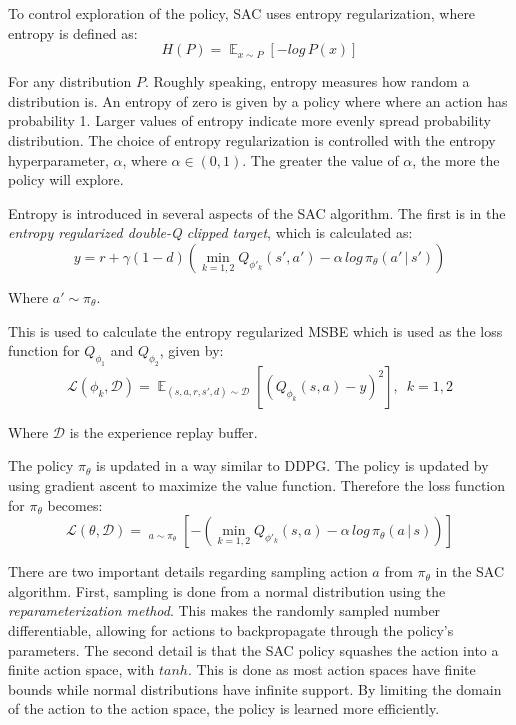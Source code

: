 \documentclass[conference]{IEEEtran}
\begin{document}
To control exploration of the policy, SAC uses entropy regularization, where entropy is defined as:
$$
    H(P) = \mathop{\mathbb{E}}_{x \sim P} \left[- log \, P(x)\right]
$$
\begin{flushleft}
    For any distribution $P$. Roughly speaking, entropy measures how random a distribution is. An entropy of zero is given by a policy where where an action has probability 1. Larger values of entropy indicate more evenly spread probability distribution. The choice of entropy regularization is controlled with the entropy hyperparameter, $\alpha$, where $\alpha \in (0, 1)$. The greater the value of $\alpha$, the more the policy will explore.
\end{flushleft}

Entropy is introduced in several aspects of the SAC algorithm. The first is in the \textit{entropy regularized double-Q clipped target}, which is calculated as:
$$
    y = r + \gamma(1-d)\left(\mathop{min}_{k=1,2}Q_{\phi'_k}(s', a') - \alpha \, log \, \pi_\theta(a' \, | \, s')\right)
$$

\begin{flushleft}
    Where $a' \sim \pi_\theta$.
\end{flushleft}

This is used to calculate the entropy regularized MSBE which is used as the loss function for $Q_{\phi_1}$ and $Q_{\phi_2}$, given by:
$$
    \mathcal{L}(\phi_k, \mathcal{D}) = \mathop{\mathbb{E}}_{(s,a,r,s',d) \sim \mathcal{D}}\left[\left(Q_{\phi_k}(s,a) - y\right)^2\right], \enspace k=1,2
$$
\begin{flushleft}
    Where $\mathcal{D}$ is the experience replay buffer.
\end{flushleft}

The policy $\pi_\theta$ is updated in a way similar to DDPG. The policy is updated by using gradient ascent to maximize the value function. Therefore the loss function for $\pi_\theta$ becomes:
$$
    \mathcal{L}(\theta, \mathcal{D}) = \mathop{\mathop{\mathbb{E}}_{s \sim \mathcal{D}}}_{a \sim \pi_\theta} \left[-\left(\mathop{min}_{k=1,2} Q_{\phi'_k}(s, a) - \alpha \, log \, \pi_\theta(a \, | \, s)\right)\right]
$$

There are two important details regarding sampling action $a$ from $\pi_\theta$ in the SAC algorithm. First, sampling is done from a normal distribution using the \textit{reparameterization method}. This makes the randomly sampled number differentiable, allowing for actions to backpropagate through the policy's parameters. The second detail is that the SAC policy squashes the action into a finite action space, with $tanh$. This is done as most action spaces have finite bounds while normal distributions have infinite support. By limiting the domain of the action to the action space, the policy is learned more efficiently.
\end{document}
